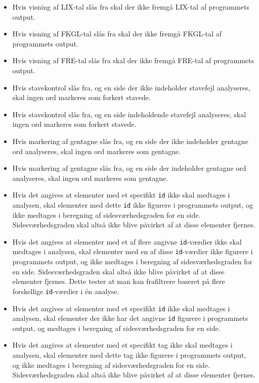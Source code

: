 \documentclass[a4paper,oneside,article, titlepage]{memoir}
\begin{document}
\begin{itemize}
\item Hvis visning af LIX-tal slås fra skal der ikke fremgå LIX-tal af
  programmets output.
\item Hvis visning af FKGL-tal slås fra skal der ikke fremgå FKGL-tal
  af programmets output.
\item Hvis visning af FRE-tal slås fra skal der ikke fremgå FRE-tal
  af programmets output.
\item Hvis stavekontrol slås fra, og en side der ikke indeholder
  stavefejl analyseres, skal ingen ord markeres som forkert stavede.
\item Hvis stavekontrol slås fra, og en side indeholdende stavefejl
  analyseres, skal ingen ord markeres som forkert stavede.
\item Hvis markering af gentagne slås fra, og en side der ikke
  indeholder gentagne ord analyseres, skal ingen ord markeres som
  gentagne.
\item Hvis markering af gentagne slås fra, og en side der indeholder
  gentagne ord analyseres, skal ingen ord markeres som gentagne.
\item Hvis det angives at elementer med et specifikt \texttt{id} ikke
  skal medtages i analysen, skal elementer med dette \texttt{id} ikke
  figurere i programmets output, og ikke medtages i beregning af
  sidesværhedsgraden for en side. Sidesværhedsgraden skal altså ikke
  blive påvirket af at disse elementer fjernes.
\item Hvis det angives at elementer med et af flere angivne
  \texttt{id}-værdier ikke skal medtages i analysen, skal elementer
  med en af disse \texttt{id}-værdier ikke figurere i programmets
  output, og ikke medtages i beregning af sidesværhedsgraden for en
  side. Sidesværhedsgraden skal altså ikke blive påvirket af at disse
  elementer fjernes. Dette tester at man kan frafiltrere baseret på
  flere forskellige \texttt{id}-værdier i én analyse.
\item Hvis det angives at elementer med et specifikt \texttt{id} ikke
  skal medtages i analysen, skal elementer der ikke har det angivne
  \texttt{id} figurere i programmets output, og medtages i beregning
  af sidesværhedsgraden for en side.
\item Hvis det angives at elementer med et specifikt tag ikke skal
  medtages i analysen, skal elementer med dette tag ikke figurere i
  programmets output, og ikke medtages i beregning af
  sidesværhedsgraden for en side. Sidesværhedsgraden skal altså ikke
  blive påvirket af at disse elementer fjernes.

\end{itemize}
\end{document}
